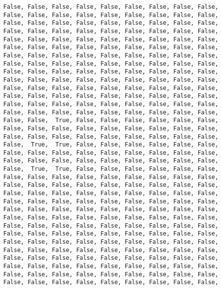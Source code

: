 \documentclass[letterpaper]{article}
\begin{document}
\begin{minipage}{\linewidth}
\begin{Verbatim}
     False, False, False, False, False, False, False, False, False,
     False, False, False, False, False, False, False, False, False,
     False, False, False, False, False, False, False, False, False,
     False, False, False, False, False, False, False, False, False,
     False, False, False, False, False, False, False, False, False,
     False, False, False, False, False, False, False, False, False,
     False, False, False, False, False, False, False, False, False,
     False, False, False, False, False, False, False, False, False,
     False, False, False, False, False, False, False, False, False,
     False, False, False, False, False, False, False, False, False,
     False, False, False, False, False, False, False, False, False,
     False, False, False, False, False, False, False, False, False,
     False, False, False, False, False, False, False, False, False,
     False, False, False, False, False, False, False, False, False,
     False, False,  True, False, False, False, False, False, False,
     False, False, False, False, False, False, False, False, False,
     False, False, False, False, False, False, False, False, False,
     False,  True,  True, False, False, False, False, False, False,
     False, False, False, False, False, False, False, False, False,
     False, False, False, False, False, False, False, False, False,
     False,  True,  True, False, False, False, False, False, False,
     False, False, False, False, False, False, False, False, False,
     False, False, False, False, False, False, False, False, False,
     False, False, False, False, False, False, False, False, False,
     False, False, False, False, False, False, False, False, False,
     False, False, False, False, False, False, False, False, False,
     False, False, False, False, False, False, False, False, False,
     False, False, False, False, False, False, False, False, False,
     False, False, False, False, False, False, False, False, False,
     False, False, False, False, False, False, False, False, False,
     False, False, False, False, False, False, False, False, False,
     False, False, False, False, False, False, False, False, False,
     False, False, False, False, False, False, False, False, False,
     False, False, False, False, False, False, False, False, False,
     False, False, False, False, False, False, False, False, False,
     
	\end{Verbatim}
\end{minipage}
\end{document}
